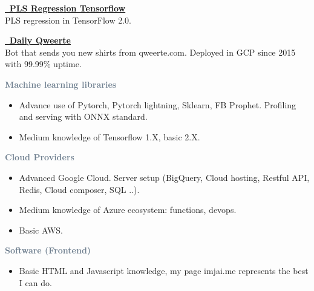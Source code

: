 \textcolor{SlateGrey}{\textbf{\href{https://github.com/jiwidi/PLS-regression-tensorflow}{\faGithub \, PLS Regression Tensorflow}}} \\ 
PLS regression in TensorFlow 2.0.
\newline
\vspace{1pt}

\textcolor{SlateGrey}{\textbf{\href{https://github.com/jiwidi/DailyQwertee}{\faGithub \, Daily Qweerte}}} \\ 
Bot that sends you new shirts from qweerte.com. Deployed in GCP since 2015 with 99.99\% uptime.
\newline
\vspace{1pt}





\textcolor{SlateGrey}{\textbf{Machine learning libraries}}
\newline

\begin{itemize}
    \item Advance use of Pytorch, Pytorch lightning, Sklearn, FB Prophet. Profiling and serving with ONNX standard.
    \item Medium knowledge of Tensorflow 1.X, basic 2.X.
\end{itemize}

\textcolor{SlateGrey}{\textbf{Cloud Providers}}
\newline

\begin{itemize}
    \item Advanced Google Cloud. Server setup (BigQuery, Cloud hosting, Restful API, Redis, Cloud composer, SQL ..).
    \item Medium knowledge of Azure ecosystem: functions, devops.
    \item Basic AWS.
\end{itemize}

\textcolor{SlateGrey}{\textbf{Software (Frontend)}}
\newline

\begin{itemize}
    \item Basic HTML and Javascript knowledge, my page imjai.me represents the best I can do.
\end{itemize}

